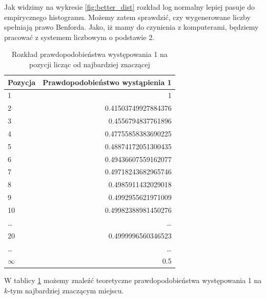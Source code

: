 Jak widzimy na wykresie \ref{fig:better_dist} rozkład log normalny lepiej pasuje do empirycznego histogramu. Możemy zatem sprawdzić, czy wygenerowane liczby spełniają prawo Benforda. Jako, iż mamy do czynienia z komputerami, będziemy pracować z systemem liczbowym o podstawie 2.
\begin{table}[H]
\begin{center}

\begin{tabular}{|l|r|}
\hline
Pozycja & \multicolumn{1}{l|}{Prawdopodobieństwo wystąpienia 1} \\\hline
1       & 1                                                    \\\hline
2       & 0.41503749927884376                                  \\\hline
3       & 0.4556794837761896                                   \\\hline
4       & 0.47755858383690225                                   \\\hline
5       & 0.48874172051300435                                   \\\hline
6       & 0.49436607559162077                                  \\\hline
7       & 0.49718243682965746                                 \\\hline
8       & 0.4985911432029018                                  \\\hline
9       & 0.4992955621971009                                   \\\hline
10      & 0.49982388981450276                                   \\\hline
\dots     & \dots                                                  \\\hline
20      & 0.4999996560346523                                   \\\hline
\dots     & \dots                                                  \\\hline
$\infty$& 0.5 \\\hline                                                
\end{tabular}
    
\end{center}
\caption{\label{tab:benford}Rozkład prawdopodobieństwa występowania 1 na pozycji licząc od najbardziej znaczącej}
\end{table}
W tablicy \ref{tab:benford} możemy znaleźć teoretyczne prawdopodobieństwa występowania 1 na $k$-tym najbardziej znaczącym miejscu.
